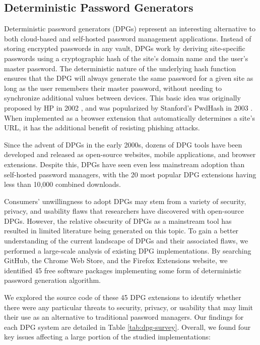 \subsection{Deterministic Password Generators}
\label{sec:survey}

Deterministic password generators (DPGs) represent an interesting alternative to both cloud-based and self-hosted password management applications. Instead of storing encrypted passwords in any vault, DPGs work by deriving site-specific passwords using a cryptographic hash of the site's domain name and the user's master password. The deterministic nature of the underlying hash function ensures that the DPG will always generate the same password for a given site as long as the user remembers their master password, without needing to synchronize additional values between devices.
This basic idea was originally proposed by HP in 2002 \cite{karp2002site}, and was popularized by Stanford's PwdHash in 2003 \cite{PwdHash}. When implemented as a browser extension that automatically determines a site's URL, it has the additional benefit of resisting phishing attacks.

Since the advent of DPGs in the early 2000s, dozens of DPG tools have been developed and released as open-source websites, mobile applications, and browser extensions. Despite this, DPGs have seen even less mainstream adoption than self-hosted password managers, with the 20 most popular DPG extensions having less than 10,000 combined downloads.

Consumers' unwillingness to adopt DPGs may stem from a variety of security, privacy, and usability flaws \cite{noauthor_4_2016, palant_security_2016} that researchers have discovered with open-source DPGs.
However, the relative obscurity of DPGs as a mainstream tool has resulted in limited literature being generated on this topic.
To gain a better understanding of the current landscape of DPGs and their associated flaws, we performed a large-scale analysis of existing DPG implementations.
By searching GitHub, the Chrome Web Store, and the Firefox Extensions website, we identified 45 free software packages implementing some form of deterministic password generation algorithm.

We explored the source code of these 45 DPG extensions to identify whether there were any particular threats to security, privacy, or usability that may limit their use as an alternative to traditional password managers. Our findings for each DPG system are detailed in Table \ref{tab:dpg-survey}. Overall, we found four key issues affecting a large portion of the studied implementations:

